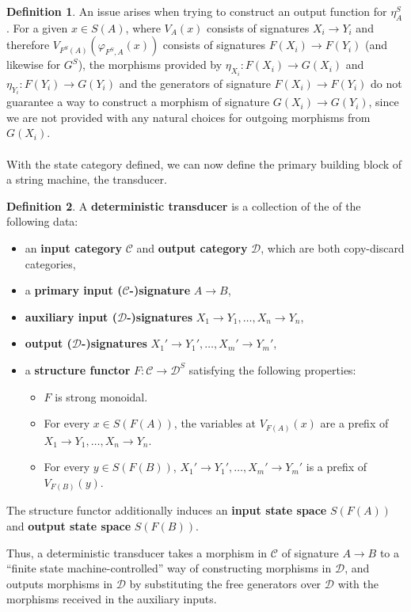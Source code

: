 \documentclass{article}
\theoremstyle{definition}
\newtheorem{definition}{Definition}[section]
\theoremstyle{remark}
\begin{document}
\begin{definition}
An issue arises when
trying to construct an output function for
$\eta_A^S$. For a given $x \in S(A)$, where
$V_A(x)$ consists of signatures $X_i\to Y_i$ and
therefore $V_{F^S(A)}(\varphi_{F^S,A}(x))$ consists of signatures
$F(X_i) \to F(Y_i)$ (and likewise for $G^S$), the morphisms provided
by $\eta_{X_i}:F(X_i)\to G(X_i)$ and $\eta_{Y_i}:
F(Y_i)\to G(Y_i)$ and the generators of signature
$F(X_i) \to F(Y_i)$ do not guarantee a way to construct a morphism
of signature $G(X_i)\to G(Y_i)$, since we are not provided with
any natural choices for outgoing morphisms from $G(X_i)$.
\\ \\
With the state category defined, we can now define the primary
building block of a string machine, the transducer.
\end{definition}
\begin{definition}
    \label{def:dettransducer}
    A \textbf{deterministic transducer} is a collection of the
    of the following data:
    \begin{itemize}
        \item an \textbf{input category} $\mathcal{C}$ and
        \textbf{output category} $\mathcal{D}$, which are both
        copy-discard categories,
        \item a \textbf{primary input ($\mathcal{C}$-)signature}
        $A\to B$,
        \item \textbf{auxiliary input ($\mathcal{D}$-)signatures}
        $X_1\to Y_1,\dots,X_n\to Y_n$,
        \item \textbf{output ($\mathcal{D}$-)signatures}
        $X_1'\to Y_1',\dots, X_m'\to Y_m'$,
        \item a \textbf{structure functor} $F:\mathcal{C}
        \to\mathcal{D}^S$ satisfying the following properties:
        \begin{itemize}
            \item $F$ is strong monoidal.
            \item For every $x\in S(F(A))$, the
            variables at $V_{F(A)}(x)$ are a prefix of
            $X_1\to Y_1,\dots, X_n \to Y_n$.
            \item For every $y \in S(F(B))$, 
            $X_1'\to Y_1',\dots, X_m'\to Y_m'$ is a prefix
            of $V_{F(B)}(y)$.
        \end{itemize}
    \end{itemize}
    The structure functor
    additionally induces an \textbf{input state space}
    $S(F(A))$ and \textbf{output state space} $S(F(B))$.
\end{definition}
Thus, a deterministic transducer takes a morphism
in $\mathcal{C}$ of signature
$A\to B$ to a ``finite state machine-controlled''
way of constructing morphisms in $\mathcal{D}$, and outputs
morphisms in $\mathcal{D}$ by substituting the free
generators over $\mathcal{D}$ with the morphisms received in
the auxiliary inputs.
\end{document}
